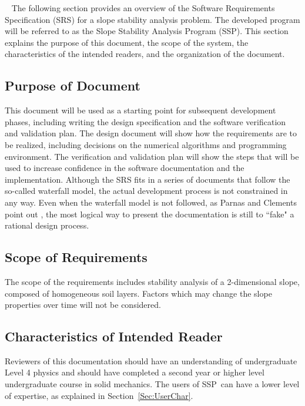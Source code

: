 \documentclass[12pt]{article}
\newcommand{\progname}{SSP}
\begin{document}
~\newline
The following section provides an overview of the Software Requirements 
Specification (SRS) for a slope stability analysis problem. The developed 
program will be referred to as the Slope Stability Analysis Program 
(\progname). This section explains the purpose of this document, the 
scope of the system, the characteristics of the intended readers, and the 
organization of the document.

\subsection{Purpose of Document}

This document will be used as a starting point for subsequent development 
phases, including writing the design specification and the software verification
 and validation plan. The design document will show how the requirements
 are to be realized, including decisions on the numerical algorithms and 
programming environment. The verification and validation plan will show
 the steps that will be used to increase confidence in the software 
 documentation
 and the implementation. Although the SRS fits in a series of documents 
that follow the so-called waterfall model, the actual development process
 is not constrained in any way. Even when the waterfall model is not followed, 
as Parnas and Clements point out \cite{ParnasAndClements1986}, the most logical 
way to present the documentation is still to ``fake" a rational design process.

\subsection{Scope of Requirements} 

The scope of the requirements includes stability analysis of a 2-dimensional 
slope, composed of homogeneous soil layers. Factors which may change the slope 
properties over time will not be considered.

\subsection{Characteristics of Intended Reader}
\label{Sec:CharofInteRead}
Reviewers of this documentation should have an understanding of undergraduate 
Level 4 physics and should have completed a second year or higher level 
undergraduate course in solid mechanics. The users of \progname\ can have a 
lower level of expertise, as explained in Section~\ref{Sec:UserChar}.
\end{document}
